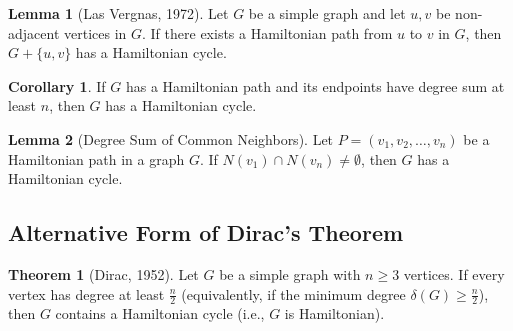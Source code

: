 \documentclass{article}
\theoremstyle{definition}
\newtheorem{theorem}{Theorem}
\newtheorem{lemma}{Lemma}
\newtheorem{corollary}{Corollary}
\begin{document}
\begin{lemma}[Las Vergnas, 1972]
Let $G$ be a simple graph and let $u, v$ be non-adjacent vertices in $G$. If there exists a Hamiltonian path from $u$ to $v$ in $G$, then $G + \{u,v\}$ has a Hamiltonian cycle.
\end{lemma}
\begin{corollary}
If $G$ has a Hamiltonian path and its endpoints have degree sum at least $n$, then $G$ has a Hamiltonian cycle.
\end{corollary}
\begin{lemma}[Degree Sum of Common Neighbors]
Let $P = (v_1, v_2, \ldots, v_n)$ be a Hamiltonian path in a graph $G$. If $N(v_1) \cap N(v_n) \neq \emptyset$, then $G$ has a Hamiltonian cycle.
\end{lemma}
\subsection{Alternative Form of Dirac's Theorem}
\begin{theorem}[Dirac, 1952]
Let $G$ be a simple graph with $n \geq 3$ vertices. If every vertex has degree at least $\frac{n}{2}$ (equivalently, if the minimum degree $\delta(G) \geq \frac{n}{2}$), then $G$ contains a Hamiltonian cycle (i.e., $G$ is Hamiltonian).
\end{theorem}
\end{document}
